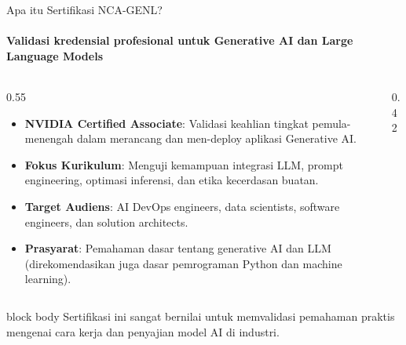 \documentclass[aspectratio=169,t]{beamer}
\newcommand{\takeaway}[1]{%
  \vspace{0.1em}
  \begin{beamercolorbox}[rounded=true,shadow=false,sep=5pt]{block body}
    \centering\footnotesize\color{nvlightgreen}#1
  \end{beamercolorbox}%
}
\begin{document}
\begin{frame}{Apa itu Sertifikasi NCA-GENL?}
  \framesubtitle{Validasi kredensial profesional untuk Generative AI dan Large Language Models}
  \begin{columns}[T]
    \begin{column}{0.55\textwidth}
      \begin{itemize}\footnotesize
        \item \textbf{NVIDIA Certified Associate}: Validasi keahlian tingkat pemula-menengah dalam merancang dan men-deploy aplikasi Generative AI.
        \item \textbf{Fokus Kurikulum}: Menguji kemampuan integrasi LLM, prompt engineering, optimasi inferensi, dan etika kecerdasan buatan.
        \item \textbf{Target Audiens}: AI DevOps engineers, data scientists, software engineers, dan solution architects.
        \item \textbf{Prasyarat}: Pemahaman dasar tentang generative AI dan LLM (direkomendasikan juga dasar pemrograman Python dan machine learning).
      \end{itemize}
    \end{column}
    \begin{column}{0.42\textwidth}
      \begin{center}
      \end{center}
    \end{column}
  \end{columns}
  \takeaway{Sertifikasi ini sangat bernilai untuk memvalidasi pemahaman praktis mengenai cara kerja dan penyajian model AI di industri.}
\end{frame}
\end{document}
